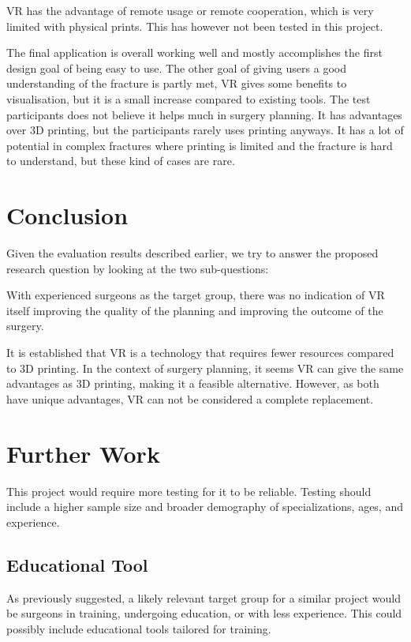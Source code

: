 \documentclass[a4paper]{report}
\begin{document}
VR has the advantage of remote usage or remote cooperation, which is very limited with physical prints. This has however not been tested in this project.

The final application is overall working well and mostly accomplishes the first design goal of being easy to use. The other goal of giving users a good understanding of the fracture is partly met, VR gives some benefits to visualisation, but it is a small increase compared to existing tools.
The test participants does not believe it helps much in surgery planning. It has advantages over 3D printing, but the participants rarely uses printing anyways. It has a lot of potential in complex fractures where printing is limited and the fracture is hard to understand, but these kind of cases are rare.

\chapter{Conclusion}
Given the evaluation results described earlier, we try to answer the proposed research question by looking at the two sub-questions:


With experienced surgeons as the target group, there was no indication of VR itself improving the quality of the planning and improving the outcome of the surgery.

It is established that VR is a technology that requires fewer resources compared to 3D printing. In the context of surgery planning, it seems VR can give the same advantages as 3D printing, making it a feasible alternative. However, as both have unique advantages, VR can not be considered a complete replacement.


\chapter{Further Work}
This project would require more testing for it to be reliable. Testing should include a higher sample size and broader demography of specializations, ages, and experience.

\section{Educational Tool}
As previously suggested, a likely relevant target group for a similar project would be surgeons in training, undergoing education, or with less experience. This could possibly include educational tools tailored for training.
\end{document}

